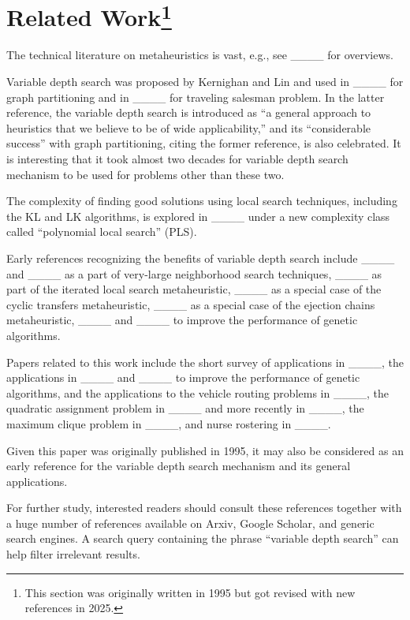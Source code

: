 \section{Related Work\protect\footnote{This section was originally written in
  1995 but got revised with new references in 2025.}
}
\label{sec:related}

The technical literature on metaheuristics is vast, e.g., see
____ for
overviews.

Variable depth search was proposed by Kernighan and Lin and used in
____ for graph partitioning and in ____ for
traveling salesman problem. In the latter reference, the variable
depth search is introduced as ``a general approach to heuristics that
we believe to be of wide applicability,'' and its ``considerable
success'' with graph partitioning, citing the former reference, is
also celebrated. It is interesting that it took almost two decades for
variable depth search mechanism to be used for problems other than
these two.

The complexity of finding good solutions using local search
techniques, including the KL and LK algorithms, is explored in
____ under a new complexity class called
``polynomial local search'' (PLS).

Early references recognizing the benefits of variable depth search
include ____ and ____ as a part of very-large
neighborhood search techniques, ____ as part of the
iterated local search metaheuristic, ____ as a special case
of the cyclic transfers metaheuristic, ____ as a special case
of the ejection chains metaheuristic, ____ and ____ to
improve the performance of genetic algorithms.

Papers related to this work include the short survey of applications
in ____, the applications in ____ and ____
to improve the performance of genetic algorithms, and the applications
to the vehicle routing problems in ____, the
quadratic assignment problem in ____ and more recently in
____, the maximum clique problem in
____, and nurse rostering in ____.

Given this paper was originally published in 1995, it may also be
considered as an early reference for the variable depth search
mechanism and its general applications.

For further study, interested readers should consult these references
together with a huge number of references available on Arxiv, Google
Scholar, and generic search engines. A search query containing the
phrase ``variable depth search'' can help filter irrelevant results.